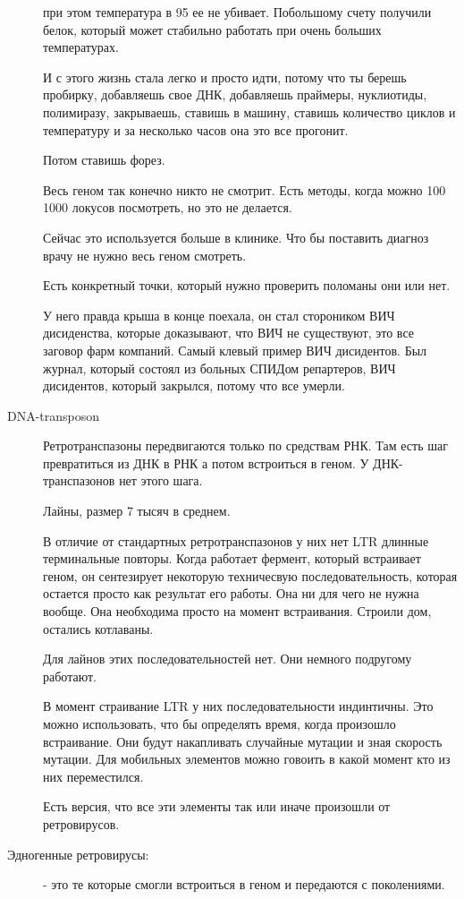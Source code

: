 \begin{description}
при этом температура в 95 ее не убивает. Побольшому счету получили белок, 
который может стабильно работать при очень больших температурах. 

И с этого жизнь стала легко и просто идти, потому что ты берешь пробирку, 
добавляешь свое ДНК, добавляешь праймеры, нуклиотиды, полимиразу, 
закрываешь, ставишь в машину, ставишь количество циклов и температуру и 
за несколько часов она это все прогонит. 

Потом ставишь форез. 

Весь геном так конечно никто не смотрит. Есть методы, когда 
можно 100 1000 локусов посмотреть, но это не делается. 

Сейчас это используется больше в клинике. Что бы поставить диагноз 
врачу не нужно весь геном смотреть. 

Есть конкретный точки, который нужно проверить поломаны они или нет. 

У него правда крыша в конце поехала, он стал стороником ВИЧ дисиденства, 
которые доказывают, что ВИЧ не существуют, это все заговор фарм компаний. 
Самый клевый пример ВИЧ дисидентов. Был журнал, который состоял из
больных СПИДом репартеров, ВИЧ дисидентов, который закрылся, потому что 
все умерли. 

\item[DNA-transposon]
Ретротранспазоны передвигаются только по средствам РНК. Там есть шаг превратиться
из ДНК в РНК а потом встроиться в геном. У ДНК-транспазонов нет этого шага. 

Лайны, размер 7 тысяч в среднем. 

В отличие от стандартных ретротранспазонов у них нет LTR длинные терминальные повторы. 
Когда работает фермент, который встраивает геном, он сентезирует некоторую 
техничесвую последовательность, которая остается просто как результат его работы. 
Она ни для чего не нужна вообще. Она необходима просто на момент встраивания. Строили дом, остались 
котлаваны. 

Для лайнов этих последовательностей нет. Они немного подругому работают. 

В момент страивание LTR у них последовательности индинтичны. Это можно 
использовать, что бы определять время, когда произошло встраивание. 
Они будут накапливать случайные мутации и зная скорость мутации. 
Для мобильных элементов можно 
говоить в какой момент кто из них 
переместился. 

Есть версия, что все эти элементы так или иначе произошли от ретровирусов.

\item[Эдногенные ретровирусы:] - это те которые смогли встроиться в геном и передаются с поколениями. 


\end{description}
